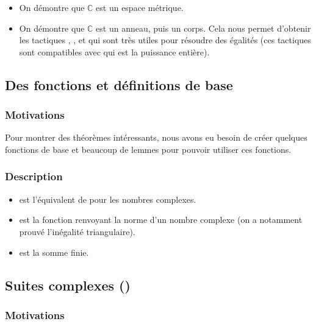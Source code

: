 \begin{itemize}
 \item {} On démontre que $\mathbb{C}$ est un espace métrique.
 \item {} On démontre que $\mathbb{C}$ est un anneau, puis un corps. Cela nous permet d'obtenir les tactiques , ,  et  qui sont très utiles pour résoudre des égalités (ces tactiques sont compatibles avec  qui est la puissance entière).
\end{itemize}


\subsection{Des fonctions et définitions de base}

\subsubsection{Motivations}

Pour montrer des théorèmes intéressants, nous avons eu besoin de créer quelques fonctions de base et beaucoup de lemmes pour pouvoir utiliser ces fonctions. %

\subsubsection{Description}

\begin{itemize}
 \item {} est l'équivalent de  pour les nombres complexes.
 \item {} est la fonction renvoyant la norme d'un nombre complexe (on a notamment prouvé l'inégalité triangulaire).
 \item {} est la somme finie.
\end{itemize}


\subsection{Suites complexes ()}

\subsubsection{Motivations}

